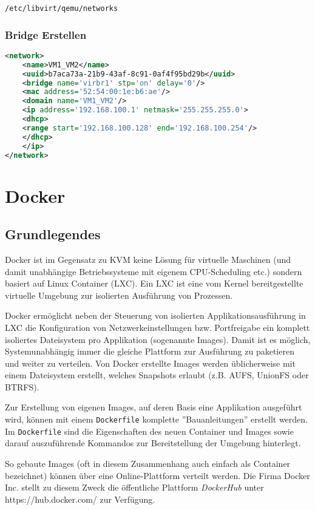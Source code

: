 \lstinline|/etc/libvirt/qemu/networks|

\subsubsection{Bridge Erstellen}
\begin{lstlisting}[language=xml]
<network>
	<name>VM1_VM2</name>
	<uuid>b7aca73a-21b9-43af-8c91-0af4f95bd29b</uuid>
	<bridge name='virbr1' stp='on' delay='0'/>
	<mac address='52:54:00:1e:b6:ae'/>
	<domain name='VM1_VM2'/>
	<ip address='192.168.100.1' netmask='255.255.255.0'>
	<dhcp>
	<range start='192.168.100.128' end='192.168.100.254'/>
	</dhcp>
	</ip>
</network>
\end{lstlisting}







\section{Docker}
\subsection{Grundlegendes}
Docker ist im Gegensatz zu KVM keine Lösung für virtuelle Maschinen (und damit unabhängige Betriebssysteme mit eigenem CPU-Scheduling etc.) sondern basiert auf Linux Container (LXC). Ein LXC ist eine vom Kernel bereitgestellte virtuelle Umgebung zur isolierten Ausführung von Prozessen.

Docker ermöglicht neben der Steuerung von isolierten Applikationsausführung in LXC die Konfiguration von Netzwerkeinstellungen bzw. Portfreigabe ein komplett isoliertes Dateisystem pro Applikation (sogenannte Images). Damit ist es möglich, Systemunabhängig immer die gleiche Plattform zur Ausführung zu paketieren und weiter zu verteilen. Von Docker erstellte Images werden üblicherweise mit einem Dateisystem erstellt, welches Snapshots erlaubt (z.B. AUFS, UnionFS oder BTRFS).

Zur Erstellung von eigenen Images, auf deren Basis eine Applikation ausgeführt wird, können mit einem \lstinline[]|Dockerfile| komplette ''Bauanleitungen'' erstellt werden. Im \lstinline[]|Dockerfile| sind die Eigenschaften des neuen Container und Images sowie darauf auszuführende Kommandos zur Bereitstellung der Umgebung hinterlegt.

So gebaute Images (oft in diesem Zusammenhang auch einfach als Container bezeichnet) können über eine Online-Plattform verteilt werden. Die Firma Docker Inc. stellt zu diesem Zweck die öffentliche Plattform \emph{DockerHub} unter https://hub.docker.com/ zur Verfügung.

